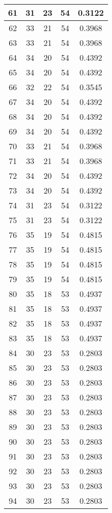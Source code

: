 \documentclass[letterpaper, 12pt]{article}
\begin{document}
\begin{longtable}{|c|c|c|c|c|}
\hline
61 & 31 & 23 & 54 & 0.3122 \\
\hline
62 & 33 & 21 & 54 & 0.3968 \\
\hline
63 & 33 & 21 & 54 & 0.3968 \\
\hline
64 & 34 & 20 & 54 & 0.4392 \\
\hline
65 & 34 & 20 & 54 & 0.4392 \\
\hline
66 & 32 & 22 & 54 & 0.3545 \\
\hline
67 & 34 & 20 & 54 & 0.4392 \\
\hline
68 & 34 & 20 & 54 & 0.4392 \\
\hline
69 & 34 & 20 & 54 & 0.4392 \\
\hline
70 & 33 & 21 & 54 & 0.3968 \\
\hline
71 & 33 & 21 & 54 & 0.3968 \\
\hline
72 & 34 & 20 & 54 & 0.4392 \\
\hline
73 & 34 & 20 & 54 & 0.4392 \\
\hline
74 & 31 & 23 & 54 & 0.3122 \\
\hline
75 & 31 & 23 & 54 & 0.3122 \\
\hline
76 & 35 & 19 & 54 & 0.4815 \\
\hline
77 & 35 & 19 & 54 & 0.4815 \\
\hline
78 & 35 & 19 & 54 & 0.4815 \\
\hline
79 & 35 & 19 & 54 & 0.4815 \\
\hline
80 & 35 & 18 & 53 & 0.4937 \\
\hline
81 & 35 & 18 & 53 & 0.4937 \\
\hline
82 & 35 & 18 & 53 & 0.4937 \\
\hline
83 & 35 & 18 & 53 & 0.4937 \\
\hline
84 & 30 & 23 & 53 & 0.2803 \\
\hline
85 & 30 & 23 & 53 & 0.2803 \\
\hline
86 & 30 & 23 & 53 & 0.2803 \\
\hline
87 & 30 & 23 & 53 & 0.2803 \\
\hline
88 & 30 & 23 & 53 & 0.2803 \\
\hline
89 & 30 & 23 & 53 & 0.2803 \\
\hline
90 & 30 & 23 & 53 & 0.2803 \\
\hline
91 & 30 & 23 & 53 & 0.2803 \\
\hline
92 & 30 & 23 & 53 & 0.2803 \\
\hline
93 & 30 & 23 & 53 & 0.2803 \\
\hline
94 & 30 & 23 & 53 & 0.2803 \\

\end{longtable}
\end{document}
